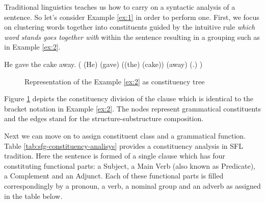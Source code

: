 Traditional linguistics teaches us how to carry on a syntactic analysis of a sentence. So let's consider Example \ref{ex:1} in order to perform one. First, we focus on clustering words together into constituents guided by the intuitive rule \textit{which word stands goes together with} within the sentence resulting in a grouping such as in Example \ref{ex:2}. 

\begin{exe}
    \ex\label{ex:1} He gave the cake away.
    \ex\label{ex:2} ( (He) (gave) ((the) (cake)) (away) (.) ) 
\end{exe}

\begin{figure}[!ht]
    \centering
    \caption{Representation of the Example \ref{ex:2} as constituency tree}
    \label{fig:mcg-graph-example-simple-structure}
\end{figure}

Figure \ref{fig:mcg-graph-example-simple-structure} depicts the constituency division of the clause which is identical to the bracket notation in Example \ref{ex:2}. The nodes represent grammatical constituents and the edges stand for the structure-substructure composition. 

Next we can move on to assign constituent class and a grammatical function. Table \ref{tab:sfg-constituency-analisys} provides a constituency analysis in SFL tradition. Here the sentence is formed of a single clause which has four constituting functional parts: a Subject, a Main Verb (also known as Predicate), a Complement and an Adjunct. Each of these functional parts is filled correspondingly by a pronoun, a verb, a nominal group and an adverb as assigned in the table below.

